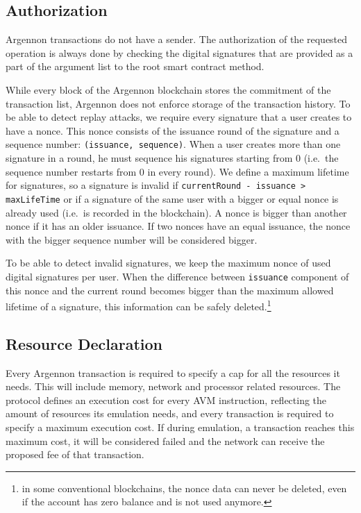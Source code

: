 \subsection{Authorization}\label{subsec:txn-auth}

Argennon transactions do not have a sender. The authorization of the requested operation is always done by checking the
digital signatures that are provided as a part of the argument list to the root smart contract method.

While every block of the Argennon blockchain stores the commitment of the transaction list, Argennon does not enforce
storage of the transaction history. To be able to detect replay attacks, we require
every signature that a user creates to have a nonce. This nonce consists of the issuance round of the signature
and a sequence number: \texttt{(issuance,\ sequence)}. When a user creates more than one signature in a round, he
must sequence his signatures starting from 0 (i.e.~the sequence number restarts from 0 in every round). We define
a maximum lifetime for signatures, so a signature is invalid if \texttt{currentRound - issuance > maxLifeTime} or
if a signature of the same user with a bigger or equal nonce is already used
(i.e.~is recorded in the blockchain). A nonce is bigger than another nonce if it has an older issuance. If two
nonces have an equal issuance, the nonce with the bigger sequence number will be considered bigger.

To be able to detect invalid signatures, we keep the maximum nonce of used digital signatures per user. When the
difference between \texttt{issuance} component of this nonce and the current round becomes bigger than the
maximum allowed lifetime of a signature, this information can be safely deleted.\footnote{in some conventional
blockchains, the nonce data can never be deleted, even if the account has zero balance and is not used anymore.}

\subsection{Resource Declaration}\label{subsec:resource-declaration}

Every Argennon transaction is required to specify a cap for all the resources it needs. This
will include memory, network and processor related resources. The protocol defines an execution cost for
every AVM instruction, reflecting the amount of resources its emulation needs, and every transaction is required
to specify a maximum execution cost. If during emulation, a transaction reaches this maximum cost, it will be
considered failed and the network can receive the proposed fee of that transaction.

